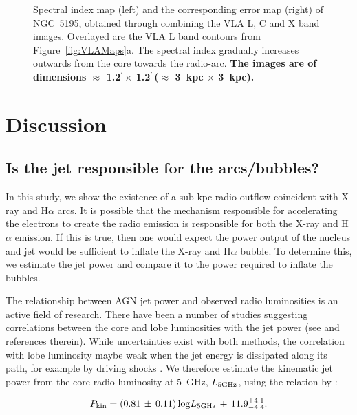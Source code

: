 \documentclass[fleqn,usenatbib]{mnras}
\def\fig{Figure}
\def\arcm{$^{\prime}\,$}
\begin{document}
\begin{figure}
{\caption{Spectral index map (left) and the corresponding error map (right) of NGC~5195, obtained through combining the VLA L, C and X band images. Overlayed are the VLA L band contours from \fig~\ref{fig:VLAMaps}a. The spectral index gradually increases outwards from the core towards the radio-arc. \textbf{The images are of dimensions $\approx$ 1.2\arcm $\times$ 1.2\arcm ($\approx$ 3~kpc $\times$ 3~kpc).}}
\label{fig:Specind}
}
\end{figure}


\section{Discussion}

\subsection{Is the jet responsible for the arcs/bubbles?}
\label{sec:jet_pwr}

{In this study, we show the existence of a sub-kpc radio outflow coincident with X-ray and H$\alpha$ arcs. It is possible that the mechanism responsible for accelerating the electrons to create the radio emission is responsible for both the X-ray and H$\alpha$ emission. If this is true, then one would expect the power output of the nucleus and jet would be sufficient to inflate the X-ray and H$\alpha$ bubble. }To determine this, we estimate the jet power and compare it to the power required to inflate the bubbles.

{The relationship between AGN jet power and observed radio luminosities is an active field of 
research. There have been a number of studies suggesting correlations between the core and lobe 
luminosities with the jet power (see \citealt{MH07,BF2011,GS2016} and references therein). While uncertainties exist with both methods,  the correlation with lobe luminosity maybe weak when the jet energy is dissipated along its path, for example by driving shocks \citep{GS2016}. We therefore estimate the kinematic jet power from the core radio luminosity at 5~GHz, $L_{5 \rm GHz}$, using the 
relation by \cite{MH07}:} 

\begin{equation}
P_{\rm kin} = (0.81\,\pm\,0.11)\,{\rm log}L_{5 \rm GHz}\, +\, 11.9^{+4.1}_{-4.4}.
\end{equation}
\end{document}
